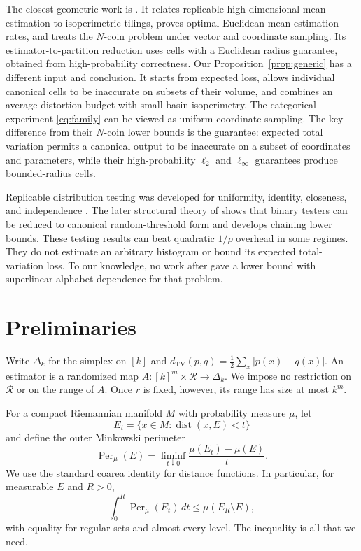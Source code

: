 \documentclass[twoside]{article}
\theoremstyle{definition}
\newcommand{\TV}{d_{\mathrm{TV}}}
\newcommand{\1}{\mathbf 1}
\newcommand{\Per}{\operatorname{Per}}
\newcommand{\dist}{\operatorname{dist}}
\begin{document}
The closest geometric work is \citet{hopkins2024}. It relates replicable high-dimensional mean estimation to isoperimetric tilings, proves optimal Euclidean mean-estimation rates, and treats the $N$-coin problem under vector and coordinate sampling. Its estimator-to-partition reduction uses cells with a Euclidean radius guarantee, obtained from high-probability correctness. Our Proposition~\ref{prop:generic} has a different input and conclusion. It starts from expected loss, allows individual canonical cells to be inaccurate on subsets of their volume, and combines an average-distortion budget with small-basin isoperimetry. The categorical experiment \eqref{eq:family} can be viewed as uniform coordinate sampling. The key difference from their $N$-coin lower bounds is the guarantee: expected total variation permits a canonical output to be inaccurate on a subset of coordinates and parameters, while their high-probability $\ell_2$ and $\ell_\infty$ guarantees produce bounded-radius cells.

Replicable distribution testing was developed for uniformity, identity, closeness, and independence \citep{liu2024,diakonikolas2025}. The later structural theory of \citet{aamand2025} shows that binary testers can be reduced to canonical random-threshold form and develops chaining lower bounds. These testing results can beat quadratic $1/\rho$ overhead in some regimes. They do not estimate an arbitrary histogram or bound its expected total-variation loss. To our knowledge, no work after \citet{bun2023} gave a lower bound with superlinear alphabet dependence for that problem.

\section{Preliminaries}

Write $\Delta_k$ for the simplex on $[k]$ and $\TV(p,q)=\frac12\sum_x|p(x)-q(x)|$. An estimator is a randomized map $A:[k]^m\times\mathcal R\to\Delta_k$. We impose no restriction on $\mathcal R$ or on the range of $A$. Once $r$ is fixed, however, its range has size at most $k^m$.

For a compact Riemannian manifold $M$ with probability measure $\mu$, let \[ E_t=\{x\in M:\dist(x,E)<t\} \] and define the outer Minkowski perimeter \[ \Per_\mu(E)=\liminf_{t\downarrow0}\frac{\mu(E_t)-\mu(E)}{t}. \] We use the standard coarea identity for distance functions. In particular, for measurable $E$ and $R>0$,
\begin{equation}
 \int_0^R \Per_\mu(E_t)\,dt
 \le \mu(E_R\setminus E),
 \label{eq:coarea}
\end{equation}
with equality for regular sets and almost every level. The inequality is all that we need.
\end{document}
